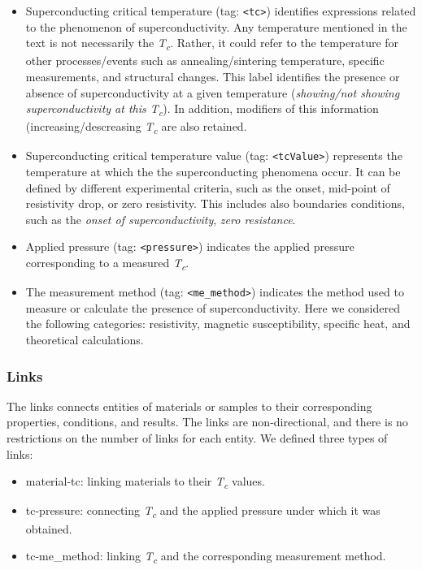 \documentclass[fleqn,10pt]{wlscirep}
\begin{document}
\begin{itemize}
\item Superconducting critical temperature (tag: \texttt{<tc>}) identifies expressions related to the phenomenon of superconductivity. Any temperature mentioned in the text is not necessarily the \textit{T\textsubscript{c}}. Rather, it could refer to the temperature for other processes/events such as annealing/sintering temperature, specific measurements, and structural changes.
This label identifies the presence or absence of superconductivity at a given temperature (\textit{showing/not showing superconductivity at this T\textsubscript{c}}).
In addition, modifiers of this information (increasing/descreasing \textit{T\textsubscript{c}} are also retained. 

\item Superconducting critical temperature value (tag: \texttt{<tcValue>}) represents the temperature at which the the superconducting phenomena occur. 
It can be defined by different experimental criteria, such as the onset, mid-point of resistivity drop, or zero resistivity.
This includes also boundaries conditions, such as the \textit{onset of superconductivity}, \textit{zero resistance}. 

\item Applied pressure (tag: \texttt{<pressure>}) indicates the applied pressure corresponding to a measured \textit{T\textsubscript{c}}. 

\item The measurement method (tag: \texttt{<me\_method>}) indicates the method used to measure or calculate the presence of superconductivity. Here we considered the following categories: resistivity, magnetic susceptibility, specific heat, and theoretical calculations. 
\end{itemize}

\FloatBarrier
\subsubsection*{Links}
The links connects entities of materials or samples to their corresponding properties, conditions, and results. 
The links are non-directional, and there is no restrictions on the number of links for each entity. 
We defined three types of links:

\begin{itemize}
    \item material-tc: linking materials to their \textit{T\textsubscript{c}} values.
    \item tc-pressure: connecting \textit{T\textsubscript{c}} and the applied pressure under which it was obtained.
    \item tc-me\_method: linking \textit{T\textsubscript{c}} and the corresponding measurement method. 
\end{itemize}
\end{document}
